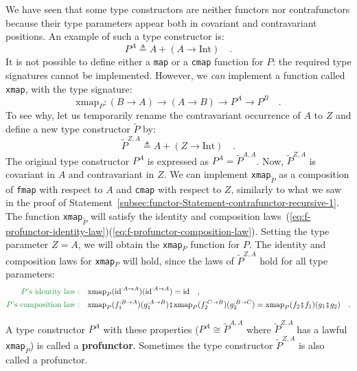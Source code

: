 We have seen that some type constructors are neither functors nor
contrafunctors because their type parameters appear both in covariant
and contravariant positions. An example of such a type constructor
is:
\[
P^{A}\triangleq A+\left(A\rightarrow\text{Int}\right)\quad.
\]
It is not possible to define either a \lstinline!map! or a \lstinline!cmap!
function for $P$: the required type signatures cannot be implemented.
However, we \emph{can} implement a function called \lstinline!xmap!,
with the type signature:
\[
\text{xmap}_{P}:\left(B\rightarrow A\right)\rightarrow\left(A\rightarrow B\right)\rightarrow P^{A}\rightarrow P^{B}\quad.
\]
To see why, let us temporarily rename the contravariant occurrence
of $A$ to $Z$ and define a new type constructor $\tilde{P}$ by:
\[
\tilde{P}^{Z,A}\triangleq A+\left(Z\rightarrow\text{Int}\right)\quad.
\]
The original type constructor $P^{A}$ is expressed as $P^{A}=\tilde{P}^{A,A}$.
Now, $\tilde{P}^{Z,A}$ is covariant in $A$ and contravariant in
$Z$. We can implement \lstinline!xmap!$_{\tilde{P}}$ as a composition
of \lstinline!fmap! with respect to $A$ and \lstinline!cmap! with
respect to $Z$, similarly to what we saw in the proof of Statement~\ref{subsec:functor-Statement-contrafunctor-recursive-1}.
The function \lstinline!xmap!$_{\tilde{P}}$ will satisfy the identity
and composition laws~(\ref{eq:f-profunctor-identity-law})\textendash (\ref{eq:f-profunctor-composition-law}).
Setting the type parameter $Z=A$, we will obtain the \lstinline!xmap!$_{P}$
function for $P$. The identity and composition laws for \lstinline!xmap!$_{P}$
will hold, since the laws of $\tilde{P}^{Z,A}$ hold for all type
parameters:
\begin{align*}
{\color{greenunder}P\text{\textsf{'}s identity law}:}\quad & \text{xmap}_{P}(\text{id}^{:A\rightarrow A})(\text{id}^{:A\rightarrow A})=\text{id}\quad,\\
{\color{greenunder}P\text{\textsf{'}s composition law}:}\quad & \text{xmap}_{P}(f_{1}^{:B\rightarrow A})(g_{1}^{:A\rightarrow B})\bef\text{xmap}_{P}(f_{2}^{:C\rightarrow B})(g_{2}^{:B\rightarrow C})=\text{xmap}_{P}(f_{2}\bef f_{1})(g_{1}\bef g_{2})\quad.
\end{align*}

A type constructor $P^{A}$ with these properties ($P^{A}\cong\tilde{P}^{A,A}$
where $\tilde{P}^{Z,A}$ has a lawful \lstinline!xmap!$_{\tilde{P}}$)
is called a \textbf{profunctor}. Sometimes
the type constructor $\tilde{P}^{Z,A}$ is also called a profunctor.

